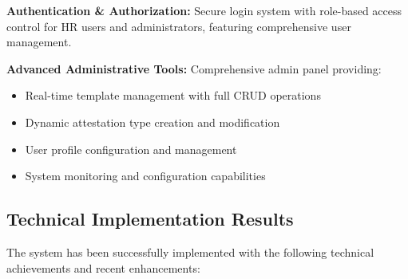 \documentclass[a4paper,12pt]{report}
\begin{document}
\begin{doublespace}
\textbf{Authentication \& Authorization:} Secure login system with role-based access control for HR users and administrators, featuring comprehensive user management.

\textbf{Advanced Administrative Tools:} Comprehensive admin panel providing:
\begin{itemize}
    \item Real-time template management with full CRUD operations
    \item Dynamic attestation type creation and modification
    \item User profile configuration and management
    \item System monitoring and configuration capabilities
\end{itemize}

\subsection{Technical Implementation Results}
\hspace{1cm}The system has been successfully implemented with the following technical achievements and recent enhancements:


\end{doublespace}
\end{document}
